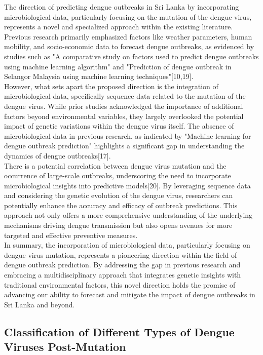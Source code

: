\documentclass[conference]{IEEEtran}
\begin{document}
The direction of predicting dengue outbreaks in Sri Lanka by incorporating microbiological data,
particularly focusing on the mutation of the dengue virus, represents a novel and specialized
approach within the existing literature. Previous research primarily emphasized factors like
weather parameters, human mobility, and socio-economic data to forecast dengue outbreaks, as
evidenced by studies such as "A comparative study on factors used to predict dengue outbreaks
using machine learning algorithm" and "Prediction of dengue outbreak in Selangor Malaysia using
machine learning techniques"[10,19]. \\

However, what sets apart the proposed direction is the integration of microbiological data,
specifically sequence data related to the mutation of the dengue virus. While prior studies
acknowledged the importance of additional factors beyond environmental variables, they largely
overlooked the potential impact of genetic variations within the dengue virus itself. The absence
of microbiological data in previous research, as indicated by "Machine learning for dengue outbreak
prediction" highlights a significant gap in understanding the dynamics of dengue outbreaks[17]. \\

There is a potential correlation between dengue virus mutation and the
occurrence of large-scale outbreaks, underscoring the need to incorporate microbiological
insights into predictive models[20]. By leveraging sequence data and considering the genetic
evolution of the dengue virus, researchers can potentially enhance the accuracy and efficacy
of outbreak predictions. This approach not only offers a more comprehensive understanding of
the underlying mechanisms driving dengue transmission but also opens avenues for more targeted
and effective preventive measures. \\

In summary, the incorporation of microbiological data, particularly focusing on dengue virus
mutation, represents a pioneering direction within the field of dengue outbreak prediction.
By addressing the gap in previous research and embracing a multidisciplinary approach that
integrates genetic insights with traditional environmental factors, this novel direction holds
the promise of advancing our ability to forecast and mitigate the impact of dengue outbreaks
in Sri Lanka and beyond. \\

\subsection{Classification of Different Types of Dengue Viruses Post-Mutation}
\end{document}
